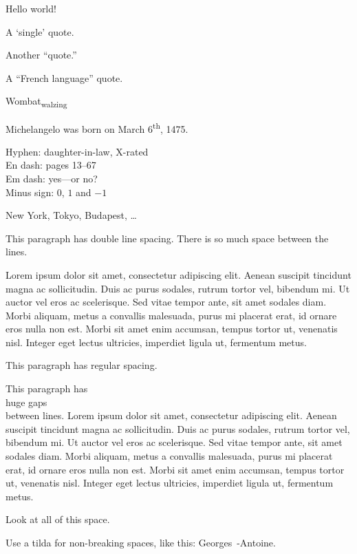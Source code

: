 \documentclass{article}
\begin{document}
Hello world!

A `single' quote.

Another ``quote.''

A
\foreignquote{french}{French language}
quote.

Wombat\textsubscript{walzing}

Michelangelo was born on March 6\textsuperscript{th}, 1475.


Hyphen: daughter-in-law, X-rated\\
En dash: pages 13--67\\
Em dash: yes---or no? \\
Minus sign: $0$, $1$ and $-1$

New York, Tokyo, Budapest, \ldots



\begin{doublespace}
  This paragraph has double line spacing.
  There is so much space between the lines.

  Lorem ipsum dolor sit amet, consectetur adipiscing elit. Aenean suscipit tincidunt magna ac sollicitudin. Duis ac purus sodales, rutrum tortor vel, bibendum mi. Ut auctor vel eros ac scelerisque. Sed vitae tempor ante, sit amet sodales diam. Morbi aliquam, metus a convallis malesuada, purus mi placerat erat, id ornare eros nulla non est. Morbi sit amet enim accumsan, tempus tortor ut, venenatis nisl. Integer eget lectus ultricies, imperdiet ligula ut, fermentum metus.
\end{doublespace}

This paragraph has regular spacing.

\begin{spacing}{2.5}
  This paragraph has \\ huge gaps \\ between lines. Lorem ipsum dolor sit amet, consectetur adipiscing elit. Aenean suscipit tincidunt magna ac sollicitudin. Duis ac purus sodales, rutrum tortor vel, bibendum mi. Ut auctor vel eros ac scelerisque. Sed vitae tempor ante, sit amet sodales diam. Morbi aliquam, metus a convallis malesuada, purus mi placerat erat, id ornare eros nulla non est. Morbi sit amet enim accumsan, tempus tortor ut, venenatis nisl. Integer eget lectus ultricies, imperdiet ligula ut, fermentum metus.

  Look at all of this space.
\end{spacing}

Use a tilda for non-breaking spaces, like this: Georges~-Antoine.
\end{document}
